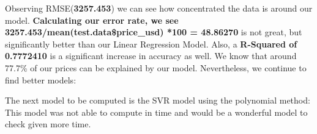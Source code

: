 \documentclass[
]{article}
\newenvironment{Shaded}{\begin{snugshade}}{\end{snugshade}}
\newcommand{\AttributeTok}[1]{\textcolor[rgb]{0.77,0.63,0.00}{#1}}
\newcommand{\CommentTok}[1]{\textcolor[rgb]{0.56,0.35,0.01}{\textit{#1}}}
\newcommand{\DecValTok}[1]{\textcolor[rgb]{0.00,0.00,0.81}{#1}}
\newcommand{\FunctionTok}[1]{\textcolor[rgb]{0.00,0.00,0.00}{#1}}
\newcommand{\NormalTok}[1]{#1}
\newcommand{\OtherTok}[1]{\textcolor[rgb]{0.56,0.35,0.01}{#1}}
\newcommand{\SpecialCharTok}[1]{\textcolor[rgb]{0.00,0.00,0.00}{#1}}
\newcommand{\StringTok}[1]{\textcolor[rgb]{0.31,0.60,0.02}{#1}}
\begin{document}
Observing RMSE(\textbf{3257.453}) we can see how concentrated the data
is around our model. \textbf{Calculating our error rate, we see
3257.453/mean(test.data\$price\_usd) *100 = 48.86270} is not great, but
significantly better than our Linear Regression Model. Also, a
\textbf{R-Squared of 0.7772410} is a significant increase in accuracy as
well. We know that around 77.7\% of our prices can be explained by our
model. Nevertheless, we continue to find better models:

The next model to be computed is the SVR model using the polynomial
method: This model was not able to compute in time and would be a
wonderful model to check given more time.

\begin{Shaded}
\end{Shaded}

\begin{Shaded}
\end{Shaded}
\end{document}

